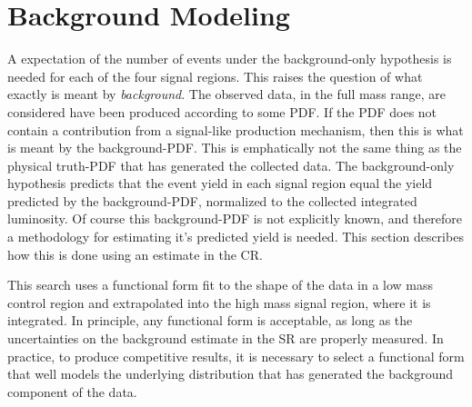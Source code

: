 \section{Background Modeling}\label{sec:ciBkg}

A expectation of the number of events under the background-only hypothesis is needed for each of the four signal regions.
This raises the question of what exactly is meant by \emph{background}.
The observed data, in the full mass range, are considered have been produced according to some PDF.
If the PDF does not contain a contribution from a signal-like production mechanism, then this is what is meant by the background-PDF.
This is emphatically not the same thing as the physical truth-PDF that has generated the collected data.
The background-only hypothesis predicts that the event yield in each signal region equal the yield predicted by the background-PDF, normalized to the collected integrated luminosity.
Of course this background-PDF is not explicitly known, and therefore a methodology for estimating it's predicted yield is needed.
This section describes how this is done using an estimate in the CR.

This search uses a functional form fit to the shape of the data in a low mass control region and extrapolated into the high mass signal region, where it is integrated.
In principle, any functional form is acceptable, as long as the uncertainties on the background estimate in the SR are properly measured.
In practice, to produce competitive results, it is necessary to select a functional form that well models the underlying distribution that has generated the background component of the data.

